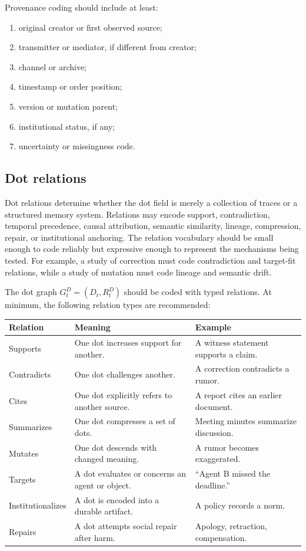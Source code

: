 \documentclass[11pt]{article}
\theoremstyle{remark}
\begin{document}
Provenance coding should include at least:
\begin{enumerate}[leftmargin=*]
\item original creator or first observed source;
\item transmitter or mediator, if different from creator;
\item channel or archive;
\item timestamp or order position;
\item version or mutation parent;
\item institutional status, if any;
\item uncertainty or missingness code.
\end{enumerate}

\subsection{Dot relations}\label{dot-relation-measurement}

Dot relations determine whether the dot field is merely a collection of traces or a structured memory system. Relations may encode support, contradiction, temporal precedence, causal attribution, semantic similarity, lineage, compression, repair, or institutional anchoring. The relation vocabulary should be small enough to code reliably but expressive enough to represent the mechanisms being tested. For example, a study of correction must code contradiction and target-fit relations, while a study of mutation must code lineage and semantic drift.


The dot graph \(G_t^D=(D_t,R_t^D)\) should be coded with typed relations.
At minimum, the following relation types are recommended:

\begin{longtable}{L{0.22\textwidth}L{0.34\textwidth}L{0.34\textwidth}}
\toprule
\textbf{Relation} & \textbf{Meaning} & \textbf{Example}\\
\midrule
\endhead
Supports & One dot increases support for another. & A witness statement supports a claim.\\
Contradicts & One dot challenges another. & A correction contradicts a rumor.\\
Cites & One dot explicitly refers to another source. & A report cites an earlier document.\\
Summarizes & One dot compresses a set of dots. & Meeting minutes summarize discussion.\\
Mutates & One dot descends with changed meaning. & A rumor becomes exaggerated.\\
Targets & A dot evaluates or concerns an agent or object. & ``Agent B missed the deadline.''\\
Institutionalizes & A dot is encoded into a durable artifact. & A policy records a norm.\\
Repairs & A dot attempts social repair after harm. & Apology, retraction, compensation.\\
\bottomrule
\end{longtable}
\end{document}
